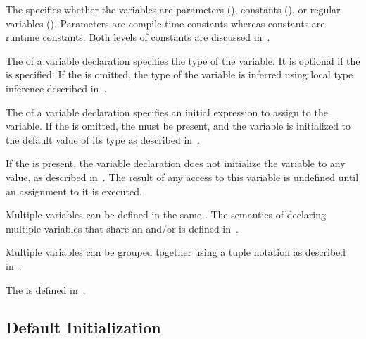 The  specifies whether the variables are
parameters (), constants (), or regular
variables ().  Parameters are compile-time constants whereas
constants are runtime constants.  Both levels of constants are
discussed in~.

The  of a variable declaration specifies the type of
the variable.  It is optional if the  is
specified.  If the  is omitted, the type of the
variable is inferred using local type inference described
in~.

The  of a variable declaration specifies an
initial expression to assign to the variable.  If
the  is omitted, the  must
be present, and the variable is initialized to the default value of
its type as described in~.

If the  is present, the variable
declaration does not initialize the variable to any value, as described
in~. The result of any access to this variable is
undefined until an assignment to it is executed.

Multiple variables can be defined in the
same .  The semantics of declaring
multiple variables that share an 
and/or  is defined in~.

Multiple variables can be grouped together using a tuple notation as
described in~.

The  is defined
in~.

\subsection{Default Initialization}
\label{Default_Values_For_Types}


